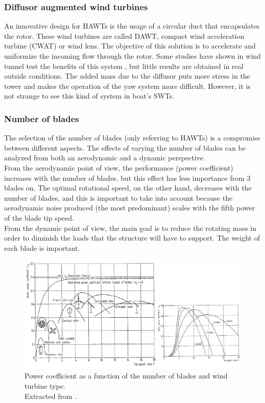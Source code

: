 \documentclass[../TFG_Report.tex]{subfiles}
\begin{document}
\subsubsection*{Diffusor augmented wind turbines}

An innovative design for HAWTs is the usage of a circular duct that encapsulates the rotor. These wind turbines are called DAWT, compact wind acceleration turbine (CWAT) or wind lens. The objective of this solution is to accelerate and uniformize the incoming flow through the rotor. Some studies have shown in wind tunnel test the benefits of this system \cite{DAWT}, but little results are obtained in real outside conditions. The added mass due to the diffusor puts more stress in the tower and makes the operation of the yaw system more difficult. However, it is not strange to see this kind of system in boat's SWTs. \cite{DesignControl}


\subsubsection*{Number of blades}

The selection of the number of blades (only referring to HAWTs) is a compromise between different aspects. The effects of varying the number of blades can be analyzed from both an aerodynamic and a dynamic perspective. \\

From the aerodynamic point of view, the performance (power coefficient) increases with the number of blades, but this effect has less importance from 3 blades on. The optimal rotational speed, on the other hand, decreases with the number of blades, and this is important to take into account because the aerodynamic noise produced (the most predominant)  scales with the fifth power of the blade tip speed. \\

From the dynamic point of view, the main goal is to reduce the rotating mass in order to diminish the loads that the structure will have to support. The weight of each blade is important. \\

\begin{figure}[h!]
	\centering
	\includegraphics[width=1\linewidth]{Images/Cp_number_blades}
	\caption[Power coefficient as a function of the number of blades and wind turbine type]{Power coefficient as a function of the number of blades and wind turbine type. \\ Extracted from \cite{Apunts}.}
	\label{fig:cpnumberblades}
\end{figure}
\end{document}
